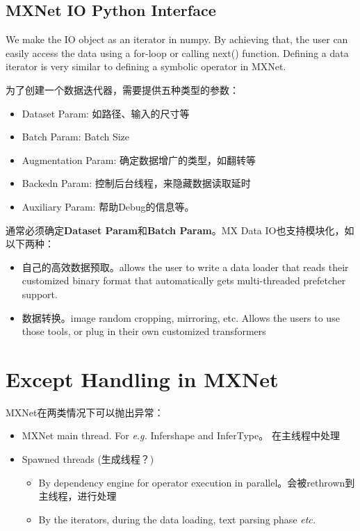\subsection{MXNet IO Python Interface}

We make the IO object as an iterator in numpy. By achieving that, the user can easily access the data using a for-loop or calling next() function. Defining a data iterator is very similar to defining a symbolic operator in MXNet.

为了创建一个数据迭代器，需要提供五种类型的参数：

\begin{itemize}
\item Dataset Param: 如路径、输入的尺寸等
\item Batch Param: Batch Size
\item Augmentation Param: 确定数据增广的类型，如翻转等
\item Backedn Param:  控制后台线程，来隐藏数据读取延时
\item Auxiliary Param: 帮助Debug的信息等。
\end{itemize}

通常必须确定\textbf{Dataset Param}和\textbf{Batch Param}。MX Data IO也支持模块化，如以下两种：
\begin{itemize}
\item 自己的高效数据预取。allows the user to write a data loader that reads their customized binary format that automatically gets multi-threaded prefetcher support.

\item 数据转换。image random cropping, mirroring, etc. Allows the users to use those tools, or plug in their own customized transformers

\end{itemize}


\section{Except Handling in MXNet}

MXNet在两类情况下可以抛出异常：
\begin{itemize}
\item MXNet main thread. For \textit{e.g.} Infershape and InferType。 在主线程中处理
\item Spawned threads (生成线程？)
\begin{itemize}
\item By dependency engine for operator execution in parallel。会被rethrown到主线程，进行处理
\item By the iterators, during the data loading, text parsing phase \textit{etc.}
\end{itemize}
\end{itemize}

